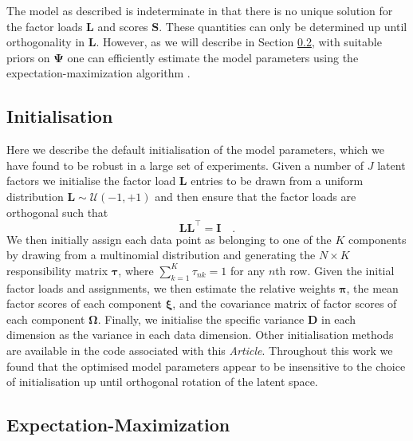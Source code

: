 \documentclass[twocolumn]{aastex62}
\newcommand{\vect}[1]{\boldsymbol{\mathbf{#1}}}
\renewcommand{\vec}[1]{\vect{#1}}
\newcommand{\transpose}{^\intercal}
\newcommand{\eye}{\textbf{I}}
\newcommand{\factorloads}{\textbf{L}}
\newcommand{\factorscores}{\textbf{S}}
\newcommand{\specificvariance}{\vec{D}}
\newcommand{\scoremeans}{\vec\xi}
\newcommand{\scorecovs}{\vec\Omega}
\newcommand{\NumData}{N}
\newcommand{\NumLatentFactors}{J}
\newcommand{\NumComponents}{K}
\begin{document}
The model as described is indeterminate in that there is no unique 
solution for the factor loads $\factorloads$ and scores
$\factorscores$. These quantities can only be determined up until 
orthogonality in $\factorloads$. However, as we will describe in Section \ref{sec:expectation-maximization}, with suitable priors on $\vec\Psi$ 
one can efficiently estimate the model parameters using the expectation-maximization
algorithm \citep{Dempster:1977}. 


\subsection{Initialisation} \label{sec:initialisation}

Here we describe the default initialisation of the model parameters, which
we have found to be robust in a large set of experiments. Given a number of
$\NumLatentFactors$ latent factors we initialise the factor load
$\factorloads$ entries to be drawn from a uniform distribution
$\factorloads \sim \mathcal{U}\left(-1, +1\right)$ and then ensure that
the factor loads are orthogonal such that
\begin{equation}
	\factorloads \factorloads\transpose = \eye \quad .
\end{equation}
We then initially assign each data point as belonging to one of the
$\NumComponents$ components by drawing from a multinomial distribution
and generating the $\NumData \times \NumComponents$ responsibility matrix $\vec\tau$,
where $\sum_{k=1}^{K} \tau_{nk} = 1$ for any $n$th row. Given the initial
factor loads and assignments, we then estimate the relative weights
$\vec\pi$, the mean factor scores of each component $\scoremeans$, and
the covariance matrix of factor scores of each component $\scorecovs$.
Finally, we initialise the specific variance $\specificvariance$ in each
dimension as the variance in each data dimension. Other initialisation 
methods are available in the code associated with this \emph{Article}. 
Throughout this work we found that the optimised model parameters appear
to be insensitive to the choice of initialisation up until orthogonal
rotation of the latent space.


\subsection{Expectation-Maximization} \label{sec:expectation-maximization}
\end{document}
